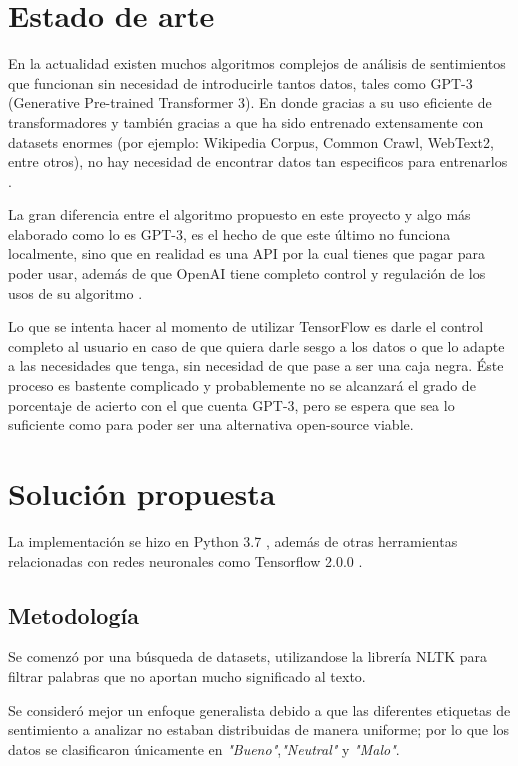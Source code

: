 \documentclass[a4]{sciposter}
\begin{document}
\begin{multicols}{2}
\begin{figure}
\end{figure}

\section{Estado de arte}

En la actualidad existen muchos algoritmos complejos de análisis de sentimientos que funcionan sin necesidad de introducirle tantos datos, tales como GPT-3 (Generative Pre-trained Transformer 3). En donde gracias a su uso eficiente de transformadores y también gracias a que ha sido entrenado extensamente con datasets enormes (por ejemplo: Wikipedia Corpus, Common Crawl, WebText2, entre otros), no hay necesidad de encontrar datos tan especificos para entrenarlos \citep{gpt3}.

La gran diferencia entre el algoritmo propuesto en este proyecto y algo más elaborado como lo es GPT-3, es el hecho de que este último no funciona localmente, sino que en realidad es una API por la cual tienes que pagar para poder usar, además de que OpenAI tiene completo control y regulación de los usos de su algoritmo \citep{openai}. 

Lo que se intenta hacer al momento de utilizar TensorFlow es darle el control completo al usuario en caso de que quiera darle sesgo a los datos o que lo adapte a las necesidades que tenga, sin necesidad de que pase a ser una caja negra. Éste proceso es bastente complicado y probablemente no se alcanzará el grado de porcentaje de acierto con el que cuenta GPT-3, pero se espera que sea lo suficiente como para poder ser una alternativa open-source viable.

\section{Solución propuesta}
La implementación se hizo en Python 3.7 \citep{python}, además de otras herramientas relacionadas con redes neuronales como Tensorflow 2.0.0 \citep{tensorflow}.


\subsection{Metodología}
Se comenzó por una búsqueda de datasets, utilizandose la librería NLTK \citep{nltk} para filtrar palabras que no aportan mucho significado al texto.

Se consideró mejor un enfoque generalista debido a que las diferentes etiquetas de sentimiento a analizar no estaban distribuidas de manera uniforme; por lo que los datos se clasificaron únicamente en \textit{"Bueno"},\textit{"Neutral"} y \textit{"Malo"}.


\end{multicols}
\end{document}
